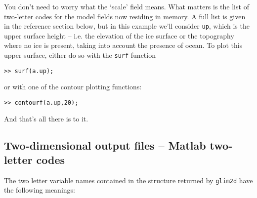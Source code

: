 \documentclass[11pt]{article}
\begin{document}
% 
You don't need to worry what the `scale' field means. What
matters is the list of two-letter codes for the model fields now residing in
memory. A full list is given in the reference section below, but in this
example we'll consider \texttt{up}, which is the upper surface height --
i.e. the elevation of the ice surface or the topography where no ice is
present, taking into account the presence of ocean. To plot this upper
surface, either do so with the \texttt{surf} function
%
\begin{verbatim}
>> surf(a.up);
\end{verbatim}
%
or with one of the contour plotting functions:
%
\begin{verbatim}
>> contourf(a.up,20);
\end{verbatim}
%
And that's all there is to it.
%
\subsection{Two-dimensional output files -- Matlab two-letter codes}
%
The two letter variable names contained in the structure returned by
\texttt{glim2d} have the following meanings:
%
\end{document}
